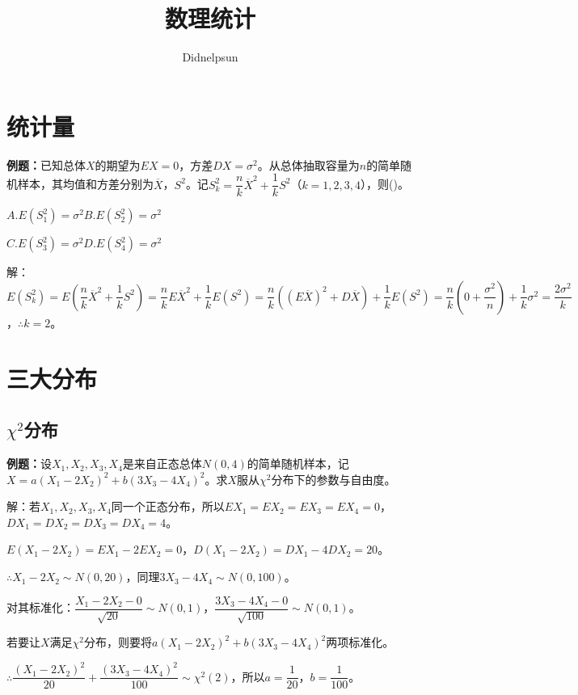 \documentclass[UTF8, 12pt]{ctexart}
\author{Didnelpsun}
\title{数理统计}
\date{}
\begin{document}
\maketitle
\pagestyle{empty}
\thispagestyle{empty}
\tableofcontents
\thispagestyle{empty}
\newpage
\pagestyle{plain}
\setcounter{page}{1}
\section{统计量}

\textbf{例题：}已知总体$X$的期望为$EX=0$，方差$DX=\sigma^2$。从总体抽取容量为$n$的简单随机样本，其均值和方差分别为$\overline{X}$，$S^2$。记$S_k^2=\dfrac{n}{k}\overline{X}^2+\dfrac{1}{k}S^2$（$k=1,2,3,4$），则()。

$A.E(S_1^2)=\sigma^2$\qquad$B.E(S_2^2)=\sigma^2$

$C.E(S_3^2)=\sigma^2$\qquad$D.E(S_4^2)=\sigma^2$

解：$E(S_k^2)=E\left(\dfrac{n}{k}\overline{X}^2+\dfrac{1}{k}S^2\right)=\dfrac{n}{k}E\overline{X}^2+\dfrac{1}{k}E(S^2)=\dfrac{n}{k}((E\overline{X})^2+D\overline{X})+\dfrac{1}{k}E(S^2)=\dfrac{n}{k}\left(0+\dfrac{\sigma^2}{n}\right)+\dfrac{1}{k}\sigma^2=\dfrac{2\sigma^2}{k}$，$\therefore k=2$。

\section{三大分布}

\subsection{\texorpdfstring{$\chi^2$分布}{}}

\textbf{例题：}设$X_1,X_2,X_3,X_4$是来自正态总体$N(0,4)$的简单随机样本，记$X=a(X_1-2X_2)^2+b(3X_3-4X_4)^2$。求$X$服从$\chi^2$分布下的参数与自由度。

解：若$X_1,X_2,X_3,X_4$同一个正态分布，所以$EX_1=EX_2=EX_3=EX_4=0$，$DX_1=DX_2=DX_3=DX_4=4$。

$E(X_1-2X_2)=EX_1-2EX_2=0$，$D(X_1-2X_2)=DX_1-4DX_2=20$。

$\therefore X_1-2X_2\sim N(0,20)$，同理$3X_3-4X_4\sim N(0,100)$。

对其标准化：$\dfrac{X_1-2X_2-0}{\sqrt{20}}\sim N(0,1)$，$\dfrac{3X_3-4X_4-0}{\sqrt{100}}\sim N(0,1)$。

若要让$X$满足$\chi^2$分布，则要将$a(X_1-2X_2)^2+b(3X_3-4X_4)^2$两项标准化。

$\therefore\dfrac{(X_1-2X_2)^2}{20}+\dfrac{(3X_3-4X_4)^2}{100}\sim\chi^2(2)$，所以$a=\dfrac{1}{20}$，$b=\dfrac{1}{100}$。
\end{document}
